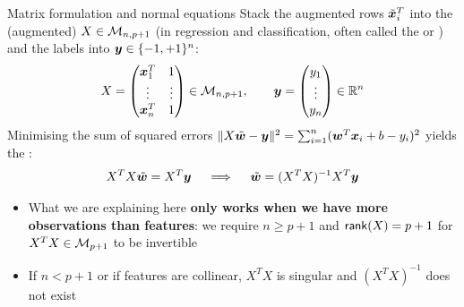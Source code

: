 \documentclass[aspectratio=169]{beamer}\usepackage[]{graphicx}\usepackage[]{xcolor}
\begin{document}
\begin{frame}{Matrix formulation and normal equations}
    Stack the augmented rows $\tilde{\bm{x}}_i^T$ into the (augmented)  $X \in \mathcal{M}_{n, p+1}$ (in regression and classification, often called the  or ) and the labels into $\bm{y} \in \{-1, +1\}^n$:
    \[
        X = \begin{pmatrix} \bm{x}_1^T & 1 \\ \vdots & \vdots \\ \bm{x}_n^T & 1 \end{pmatrix} \in \mathcal{M}_{n, p+1}, \qquad
        \bm{y} = \begin{pmatrix} y_1 \\ \vdots \\ y_n \end{pmatrix} \in \mathbb{R}^n
    \]
    \vfill
    Minimising the sum of squared errors $\|X\tilde{\bm{w}} - \bm{y}\|^2 = \sum_{i=1}^n (\bm{w}^T \bm{x}_i + b - y_i)^2$ yields the :
    \[
        X^T X \tilde{\bm{w}} = X^T \bm{y} \quad \implies \quad \tilde{\bm{w}} = (X^T X)^{-1} X^T \bm{y}
    \]
    \vfill
    \begin{itemize}
        \item What we are explaining here \textbf{only works when we have more observations than features}: we require $n \ge p + 1$ and $\mathsf{rank}(X) = p + 1$ for $X^T X \in \mathcal{M}_{p+1}$ to be invertible
        \vfill
        \item If $n < p + 1$ or if features are collinear, $X^T X$ is singular and $(X^T X)^{-1}$ does not exist
    \end{itemize}
\end{frame}
\end{document}
